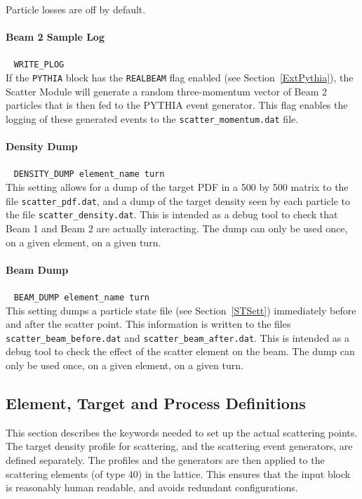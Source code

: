 Particle losses are off by default.

\paragraph{Beam 2 Sample Log}~ \texttt{WRITE\_PLOG}\\

If the \texttt{PYTHIA} block has the \texttt{REALBEAM} flag enabled (see Section~\ref{ExtPythia}), the Scatter Module will generate a random three-momentum vector of Beam 2 particles that is then fed to the PYTHIA event generator.
This flag enables the logging of these generated events to the \texttt{scatter\_momentum.dat} file.

\paragraph{Density Dump}~ \texttt{DENSITY\_DUMP element\_name turn}\\

This setting allows for a dump of the target PDF in a 500 by 500 matrix to the file \texttt{scatter\_pdf.dat}, and a dump of the target density seen by each particle to the file \texttt{scatter\_density.dat}.
This is intended as a debug tool to check that Beam 1 and Beam 2 are actually interacting.
The dump can only be used once, on a given element, on a given turn.

\paragraph{Beam Dump}~ \texttt{BEAM\_DUMP element\_name turn}\\

This setting dumps a particle state file (see Section~\ref{STSett}) immediately before and after the scatter point.
This information is written to the files \texttt{scatter\_beam\_before.dat} and \texttt{scatter\_beam\_after.dat}.
This is intended as a debug tool to check the effect of the scatter element on the beam.
The dump can only be used once, on a given element, on a given turn.

\subsection{Element, Target and Process Definitions}

This section describes the keywords needed to set up the actual scattering points.
The target density profile for scattering, and the scattering event generators, are defined separately.
The profiles and the generators are then applied to the scattering elements (of type 40) in the lattice.
This ensures that the input block is reasonably human readable, and avoids redundant configurations.

